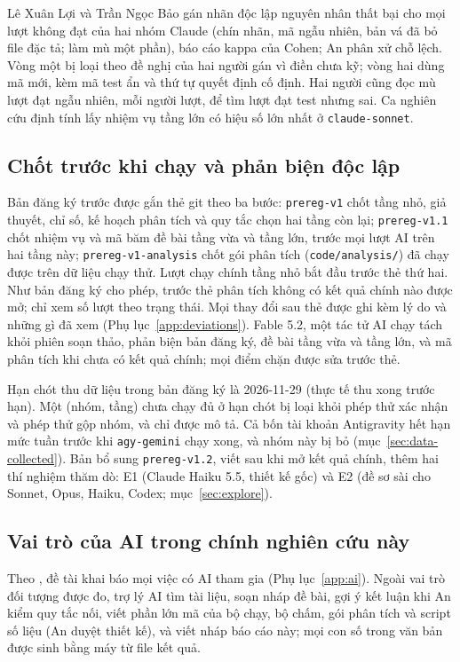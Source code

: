 Lê Xuân Lợi và Trần Ngọc Bảo gán nhãn độc lập nguyên nhân thất bại cho mọi lượt không đạt của hai nhóm
Claude (chín nhãn, mã ngẫu nhiên, bản vá đã bỏ file đặc tả; làm mù một phần), báo cáo kappa của Cohen; An
phân xử chỗ lệch. Vòng một bị loại theo đề nghị của hai người gán vì điền chưa kỹ; vòng hai dùng mã mới, kèm mã
test ẩn và thứ tự quyết định cố định. Hai người cũng đọc mù \NumPassCheckRuns{} lượt đạt ngẫu nhiên, mỗi người \NumPassCheckLoi{}
lượt, để tìm lượt đạt test nhưng sai. Ca nghiên cứu định
tính lấy nhiệm vụ tầng lớn có hiệu số lớn nhất ở \texttt{claude-sonnet}.

\subsection{Chốt trước khi chạy và phản biện độc lập}\label{sec:prereg}

Bản đăng ký trước được gắn thẻ git theo ba bước: \texttt{prereg-v1} chốt tầng nhỏ, giả thuyết, chỉ số, kế
hoạch phân tích và quy tắc chọn hai tầng còn lại; \texttt{prereg-v1.1} chốt nhiệm vụ và mã băm đề bài tầng
vừa và tầng lớn, trước mọi lượt AI trên hai tầng này; \texttt{prereg-v1-analysis} chốt gói phân tích
(\texttt{code/analysis/}) đã chạy được trên dữ liệu chạy thử. Lượt chạy chính tầng nhỏ bắt đầu trước thẻ
thứ hai. Như bản đăng ký cho phép, trước thẻ phân tích không có kết quả chính nào được mở; chỉ xem
số lượt theo trạng thái. Mọi thay đổi sau thẻ được ghi kèm lý do và những gì đã xem (Phụ lục~\ref{app:deviations}).
Fable 5.2, một tác tử AI chạy tách khỏi phiên soạn thảo, phản biện bản đăng ký, đề bài tầng vừa và tầng
lớn, và mã phân tích khi chưa có kết quả chính; mọi điểm chặn được sửa trước thẻ.

Hạn chót thu dữ liệu trong bản đăng ký là \mbox{2026-11-29} (thực tế thu xong trước hạn). Một (nhóm, tầng) chưa chạy đủ ở hạn chót bị loại khỏi phép thử
xác nhận và phép thử gộp nhóm, và chỉ được mô tả. Cả bốn tài khoản Antigravity hết hạn mức tuần trước
khi \texttt{agy-gemini} chạy xong, và nhóm này bị bỏ (mục~\ref{sec:data-collected}). Bản bổ sung
\texttt{prereg-v1.2}, viết sau khi mở kết quả chính, thêm hai thí nghiệm thăm dò: E1 (Claude Haiku 5.5, thiết kế
gốc) và E2 (đề sơ sài cho Sonnet, Opus, Haiku, Codex; mục~\ref{sec:explore}).

\subsection{Vai trò của AI trong chính nghiên cứu này}\label{sec:ai-role}

Theo \cite{baltes_2025}, đề tài khai báo mọi việc có AI tham gia (Phụ lục~\ref{app:ai}). Ngoài vai trò
đối tượng được đo, trợ lý AI tìm tài liệu, soạn nháp đề bài, gợi ý kết luận khi An kiểm quy tắc nối, viết
phần lớn mã của bộ chạy, bộ chấm, gói phân tích và script số liệu (An duyệt thiết kế), và viết nháp báo cáo
này; mọi con số trong văn bản được sinh bằng máy từ file kết quả.
